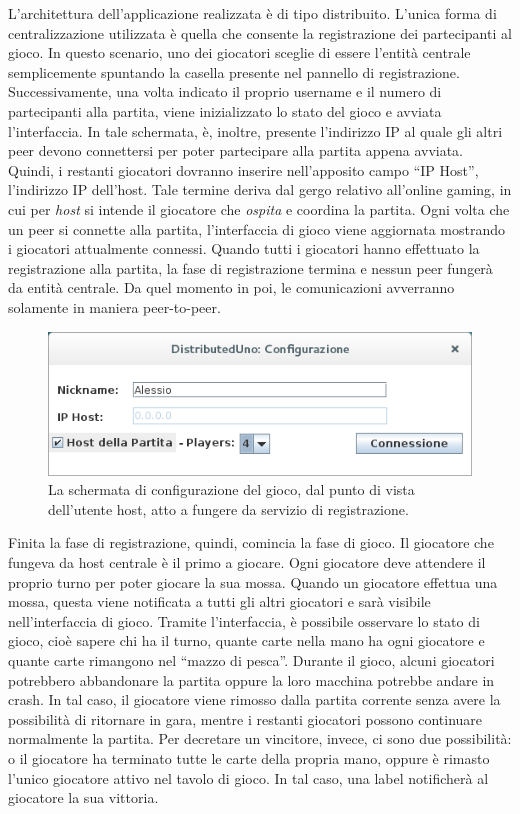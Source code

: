 \documentclass[11pt]{article} %
\begin{document}
L'architettura dell'applicazione realizzata è di tipo distribuito. L'unica forma di centralizzazione utilizzata è quella che consente la registrazione dei 
partecipanti al gioco. In questo scenario, uno dei giocatori sceglie di essere l'entità centrale semplicemente spuntando la casella presente nel pannello 
di registrazione. Successivamente, una volta indicato il proprio username e il numero di partecipanti alla partita, viene inizializzato lo stato del gioco e
avviata l'interfaccia. In tale schermata, è, inoltre, presente l'indirizzo IP al quale gli altri peer devono connettersi per poter partecipare alla 
partita appena avviata. Quindi, i restanti giocatori dovranno inserire nell'apposito campo ``IP Host'', l'indirizzo IP dell'host. Tale termine deriva dal gergo relativo all'online gaming, in cui per \textit{host} si intende il giocatore che \textit{ospita} e coordina la partita. Ogni volta che un peer si
connette alla partita, l'interfaccia di gioco viene aggiornata mostrando i giocatori attualmente connessi. Quando tutti i giocatori hanno effettuato la 
registrazione alla partita, la fase di registrazione termina e nessun peer fungerà da entità centrale. Da quel momento in poi, le comunicazioni avverranno 
solamente in maniera peer-to-peer.\\

\begin{figure}[h]
\centering%
\includegraphics[width=12cm, keepaspectratio]{configScreen2.png}%
\caption{La schermata di configurazione del gioco, dal punto di vista dell'utente host, atto a fungere da servizio di registrazione.}
\end{figure}

Finita la fase di registrazione, quindi, comincia la fase di gioco. Il giocatore che fungeva da host centrale è il primo a giocare. Ogni giocatore deve 
attendere il proprio turno per poter giocare la sua mossa. Quando un giocatore effettua una mossa, questa viene notificata a tutti gli altri giocatori e 
sarà visibile nell'interfaccia di gioco. Tramite l'interfaccia, è possibile osservare lo stato di gioco, cioè sapere chi ha il turno, quante carte nella 
mano ha ogni giocatore e quante carte rimangono nel ``mazzo di pesca''. Durante il gioco, alcuni giocatori potrebbero abbandonare la partita oppure
la loro macchina potrebbe andare in crash. In tal caso, il giocatore viene rimosso dalla partita corrente senza avere la possibilità di ritornare in gara, 
mentre i restanti giocatori possono continuare normalmente la partita. Per decretare un vincitore, invece, ci sono due possibilità: 
o il giocatore ha terminato tutte le carte della propria mano, oppure è rimasto l'unico giocatore attivo nel tavolo di gioco. 
In tal caso, una label notificherà al giocatore la sua vittoria.
\end{document}

